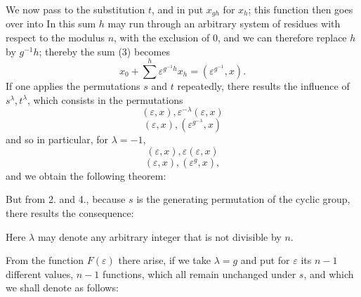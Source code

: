 We now pass to the substitution $t$, and in
put $x_{gh}$ for $x_h$; this function then goes over into
In this sum $h$ may run through an arbitrary system of residues with respect to the modulus $n$, with the exclusion of $0$, and we can therefore replace $h$ by $g^{-1}h$; thereby the sum (3) becomes
\[
x_0 + \sum^{h}\varepsilon^{g^{-1}h}x_h = (\varepsilon^{g^{-1}}, x).
\]
If one applies the permutations $s$ and $t$ repeatedly, there results the influence of $s^\lambda, t^\lambda$, which consists in the permutations
\[
(\varepsilon, x), \varepsilon^{-\lambda}(\varepsilon, x)
\]
\[
(\varepsilon, x), (\varepsilon^{g^{-\lambda}}, x)
\]
and so in particular, for $\lambda = -1$,
\[
(\varepsilon, x), \varepsilon(\varepsilon, x)
\]
\[
(\varepsilon, x), (\varepsilon^{g}, x),
\]
and we obtain the following theorem:


But from 2. and 4., because $s$ is the generating permutation of the cyclic group, there results the consequence:


Here $\lambda$ may denote any arbitrary integer that is not divisible by $n$.

From the function $F(\varepsilon)$ there arise, if we take $\lambda = g$ and put for $\varepsilon$ its $n-1$ different values, $n-1$ functions, which all remain unchanged under $s$, and which we shall denote as follows:
